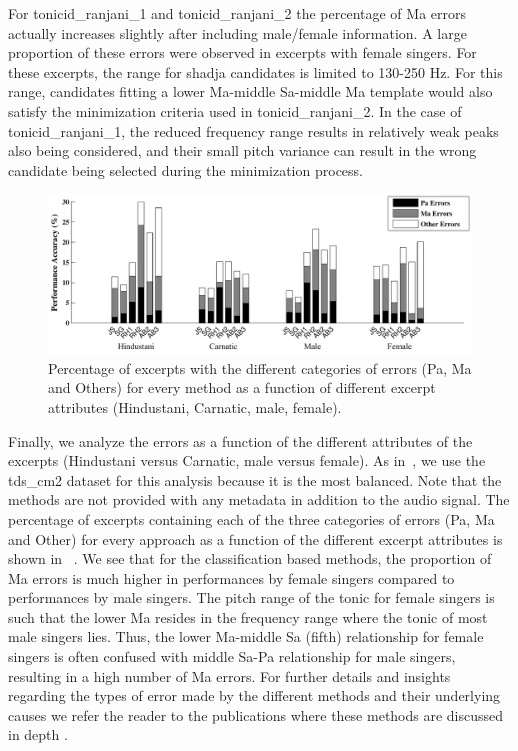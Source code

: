 {For \acrshort{tonicid_ranjani_1} and \acrshort{tonicid_ranjani_2} the percentage of Ma errors actually increases slightly after including male/female information. A large proportion of these errors were observed in excerpts with female singers. For these excerpts, the range for \gls{shadja} candidates is limited to 130-250 Hz. For this range, candidates fitting a lower Ma-middle Sa-middle Ma template would also satisfy the minimization criteria used in \acrshort{tonicid_ranjani_2}. In the case of \acrshort{tonicid_ranjani_1}, the reduced frequency range results in relatively weak peaks also being considered, and their small pitch variance can result in the wrong candidate being selected during the minimization process.

\begin{figure}
	\begin{center}
		\includegraphics[width=\figSizeHundred]{ch05_preprocessing/figures/Category_Errors.pdf}
	\end{center}
	\caption{Percentage of excerpts with the different categories of errors (Pa, Ma and Others) for every method as a function of different excerpt attributes (Hindustani, Carnatic, male, female).}
	\label{fig:tonic_identification_categorywise_errors}
\end{figure}

Finally, we analyze the errors as a function of the different attributes of the excerpts (Hindustani versus Carnatic, male versus female). As in~, we use the \acrshort{tds_cm2} dataset for this analysis because it is the most balanced. Note that the methods are not provided with any metadata in addition to the audio signal. The percentage of excerpts containing each of the three categories of errors (Pa, Ma and Other) for every approach as a function of the different excerpt attributes is shown in ~. We see that for the classification based methods, the proportion of Ma errors is much higher in performances by female singers compared to performances by male singers. The pitch range of the tonic for female singers is such that the lower Ma resides in the frequency range where the tonic of most male singers lies. Thus, the lower Ma-middle Sa (fifth) relationship for female singers is often confused with middle Sa-Pa relationship for male singers, resulting in a high number of Ma errors. For further details and insights regarding the types of error made by the
different methods and their underlying causes we refer the reader to the publications where these methods are discussed in depth \citep{salamon2012multipitch, SGulati_MThesis2012,bellur2012knowledge,ranjani2011carnatic}.


}
